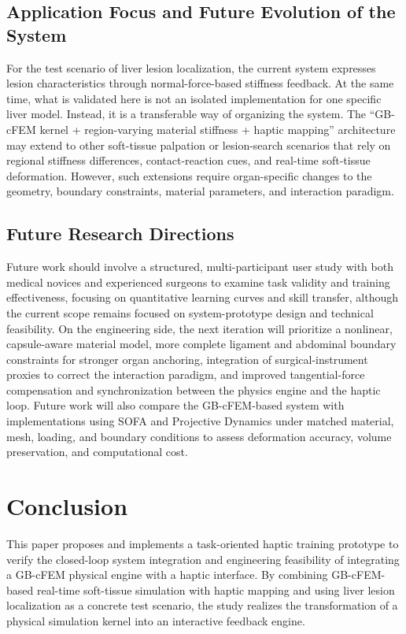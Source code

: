 \documentclass{ieeeaccess}
\begin{document}
\subsection{Application Focus and Future Evolution of the System}
For the test scenario of liver lesion localization, the current system expresses lesion characteristics through normal-force-based stiffness feedback. At the same time, what is validated here is not an isolated implementation for one specific liver model. Instead, it is a transferable way of organizing the system. The “GB-cFEM kernel + region-varying material stiffness + haptic mapping” architecture may extend to other soft-tissue palpation or lesion-search scenarios that rely on regional stiffness differences, contact-reaction cues, and real-time soft-tissue deformation. However, such extensions require organ-specific changes to the geometry, boundary constraints, material parameters, and interaction paradigm. \subsection{Future Research Directions}
Future work should involve a structured, multi-participant user study with both medical novices and experienced surgeons to examine task validity and training effectiveness, focusing on quantitative learning curves and skill transfer, although the current scope remains focused on system-prototype design and technical feasibility. On the engineering side, the next iteration will prioritize a nonlinear, capsule-aware material model, more complete ligament and abdominal boundary constraints for stronger organ anchoring, integration of surgical-instrument proxies to correct the interaction paradigm, and improved tangential-force compensation and synchronization between the physics engine and the haptic loop. Future work will also compare the GB-cFEM-based system with implementations using SOFA and Projective Dynamics under matched material, mesh, loading, and boundary conditions to assess deformation accuracy, volume preservation, and computational cost.

\section{Conclusion}
This paper proposes and implements a task-oriented haptic training prototype to verify the closed-loop system integration and engineering feasibility of integrating a GB-cFEM physical engine with a haptic interface. By combining GB-cFEM-based real-time soft-tissue simulation with haptic mapping and using liver lesion localization as a concrete test scenario, the study realizes the transformation of a physical simulation kernel into an interactive feedback engine.
\end{document}
